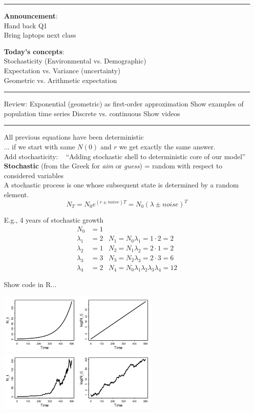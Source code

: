 \documentclass{article}
\newcommand{\note}[1]{\colorbox{gray!20}{#1}}
\begin{document}
\noindent{}

\rule[0.5ex]{\linewidth}{1pt}
\textbf{Announcement}: \\
Hand back Q1\\
Bring laptops next class

\textbf{Today's concepts}: \\
Stochasticity (Environmental vs. Demographic)\\
Expectation vs. Variance (uncertainty)\\
Geometric vs. Arithmetic expectation

\rule[0.5ex]{\linewidth}{1pt}
Review:
Exponential (geometric) as first-order approximation \note{Show examples of population time series}
Discrete vs. continuous \note{Show videos}

\rule[0.5ex]{\linewidth}{1pt}
All previous equations have been deterministic\\
... if we start with same $N(0)$ and $r$ we get exactly the same answer.\\
Add stochasticity:   ``Adding stochastic shell to deterministic core of our model''\\

\textbf{Stochastic} (from the Greek for \emph{aim} or \emph{guess}) = random with respect to considered variables\\
A stochastic process is one whose subsequent state is determined by a random element.
\begin{equation*}
	N_T = N_0 e^{(r\pm noise)T} = N_0 (\lambda \pm noise)^T
\end{equation*}

E.g., 4 years of stochastic growth
\begin{align*}
	N_0 &= 1 &\\
	\lambda_1 &= 2 & N_1 = N_0 \lambda_1 = 1\cdot 2 =  2\\
	\lambda_2 &= 1 & N_2 = N_1 \lambda_2 = 2\cdot 1 =  2\\
	\lambda_3 &= 3 & N_3 = N_2 \lambda_3 = 2\cdot 3 =  6\\
	\lambda_4 &= 2 & N_4 = N_0 \lambda_1 \lambda_2 \lambda_3 \lambda_4 =  12
\end{align*}

\note{Show code in R...}
\begin{center}
\includegraphics[width=8cm]{figs/image}\\
\includegraphics[width=8cm]{figs/image0}
\end{center}
\end{document}
